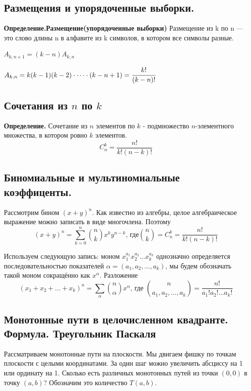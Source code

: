 \documentclass[a4paper, 10pt]{article}
\begin{document}
\subsection{Размещения и упорядоченные выборки.}

\textbf{Определение.Размещение(упорядоченные выборки)} Размещение из k по n — это слово длины n в алфавите из k символов, в котором все символы разные.

$A_{k, n + 1} = (k - n)A_{k, n}$

$A_{k, n} = k(k - 1)(k - 2) \cdot \dots \cdot (k - n + 1) = \cfrac{k!}{(k - n)!}$

\subsection{Сочетания из $n$ по $k$}

\textbf{Определение.} Сочетание из $n$ элементов по $k$ - подмножество $n$-элементного множества, в котором ровно $k$ элементов. $$C^k_n = \frac{n!}{k!(n - k)!}$$

\subsection{Биномиальные и мультиномиальные коэффиценты.}

Рассмотрим бином $(x + y)^n$. Как известно из алгебры, целое алгебраическое выражение можно записать в виде многочлена. Поэтому $$(x + y)^n = \sum^n_{k = 0} \binom{n}{k}x^{k}y^{n - k}\text{, где} \binom{n}{k} = C^k_n = \frac{n!}{k!(n - k)!}$$

Используем следующую запись: моном $x_1^{a_1}x_2^{a_2} \dots x_k^{a_k}$ однозначно определяется последовательностью показателей $\alpha =
(a_1, a_2, \dots , a_k)$, мы будем обозначать такой моном сокращённо как $x^{\alpha}$. Разложение $$(x_1 + x_2 + \dots + x_k)^n = \sum_{\alpha}\binom{n}{\alpha}x^{\alpha} \text{, где } \binom{n}{a_1, a_2, \dots , a_k} = \frac{n!}{a_1!a_2! \dots a_k!}$$

\subsection{Монотонные пути в целочисленном квадранте. Формула. Треугольник Паскаля}

Рассматриваем монотонные пути на плоскости. Мы двигаем фишку по точкам плоскости с целыми координатами. За один шаг можно увеличить абсциссу на 1 или ординату на 1. Сколько есть различных монотонных путей из точки $(0, 0)$ в точку $(a, b)$? Обозначим это количество $T(a, b)$.
\end{document}
